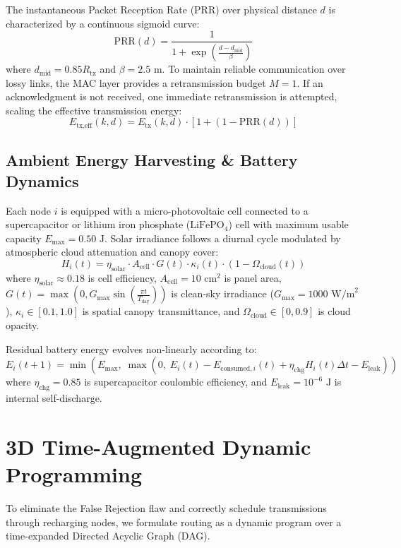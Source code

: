 \documentclass[journal]{IEEEtran}
\begin{document}
The instantaneous Packet Reception Rate (PRR) over physical distance $d$ is characterized by a continuous sigmoid curve:
\begin{equation}
\text{PRR}(d) = \frac{1}{1 + \exp\left( \frac{d - d_{\text{mid}}}{\beta} \right)}
\end{equation}
where $d_{\text{mid}} = 0.85 R_{\text{tx}}$ and $\beta = 2.5\text{ m}$. To maintain reliable communication over lossy links, the MAC layer provides a retransmission budget $M=1$. If an acknowledgment is not received, one immediate retransmission is attempted, scaling the effective transmission energy:
\begin{equation}
E_{\text{tx,eff}}(k, d) = E_{\text{tx}}(k, d) \cdot \left[ 1 + (1 - \text{PRR}(d)) \right]
\end{equation}

\subsection{Ambient Energy Harvesting \& Battery Dynamics}
Each node $i$ is equipped with a micro-photovoltaic cell connected to a supercapacitor or lithium iron phosphate ($\text{LiFePO}_4$) cell with maximum usable capacity $E_{\max} = 0.50\text{ J}$. Solar irradiance follows a diurnal cycle modulated by atmospheric cloud attenuation and canopy cover:
\begin{equation}
H_i(t) = \eta_{\text{solar}} \cdot A_{\text{cell}} \cdot G(t) \cdot \kappa_i(t) \cdot (1 - \Omega_{\text{cloud}}(t))
\label{eq:harvest}
\end{equation}
where $\eta_{\text{solar}} \approx 0.18$ is cell efficiency, $A_{\text{cell}} = 10\text{ cm}^2$ is panel area, $G(t) = \max(0, G_{\max} \sin(\frac{\pi t}{T_{\text{day}}}))$ is clean-sky irradiance ($G_{\max} = 1000\text{ W/m}^2$), $\kappa_i \in [0.1, 1.0]$ is spatial canopy transmittance, and $\Omega_{\text{cloud}} \in [0, 0.9]$ is cloud opacity.

Residual battery energy evolves non-linearly according to:
\begin{equation}
E_i(t+1) = \min \left( E_{\max}, \; \max \left( 0, \; E_i(t) - E_{\text{consumed}, i}(t) + \eta_{\text{chg}} H_i(t) \Delta t - E_{\text{leak}} \right) \right)
\label{eq:battery_evolution}
\end{equation}
where $\eta_{\text{chg}} = 0.85$ is supercapacitor coulombic efficiency, and $E_{\text{leak}} = 10^{-6}\text{ J}$ is internal self-discharge.

\section{3D Time-Augmented Dynamic Programming}
To eliminate the False Rejection flaw and correctly schedule transmissions through recharging nodes, we formulate routing as a dynamic program over a time-expanded Directed Acyclic Graph (DAG).
\end{document}
